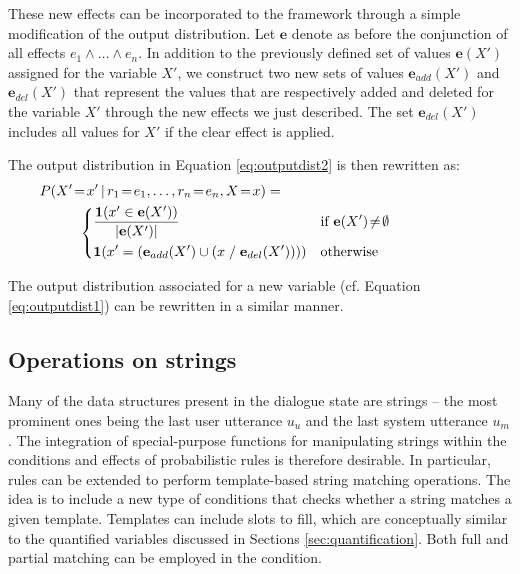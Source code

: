 These new effects can be incorporated to the framework through a simple modification of the output distribution. Let $\mathbf{e}$ denote as before the conjunction of all effects $e_1 \land \dots \land e_n$. In addition to the previously defined set of values $\mathbf{e}(X')$ assigned for the variable $X'$, we construct two new sets of values $\mathbf{e}_{add}(X')$ and $\mathbf{e}_{del}(X')$ that represent the values that are respectively added and deleted for the variable $X'$ through the new effects we just described. The set $\mathbf{e}_{del}(X')$ includes all values for $X'$ if the clear effect is applied. 

The output distribution in Equation \eqref{eq:outputdist2} is then rewritten as:
\begin{align}
&P(X'\!=\!x' \, | \, r_1\!=\!e_1, \dots, r_n\!=\!e_n, X\!=\!x) = \hspace{5cm} \nonumber \\ & \; \; \; \; \; \; \; \; \; \;  \begin{dcases} 
\frac{ \mathbf{1}(x' \in {\mathbf{e}(X')})} { |\mathbf{e}(X')| }  & \text{if } \mathbf{e}(X')\!\neq\!\emptyset \\
\mathbf{1}(x' = \left(\mathbf{e}_{add}(X') \cup \left(x \; / \; \mathbf{e}_{del}(X')\right)\right)) & \text{otherwise} \\
\end{dcases}\label{eq:outputdist4}
\end{align} 

The output distribution associated for a new variable (cf. Equation \eqref{eq:outputdist1}) can be rewritten in a similar manner.




\subsection{Operations on strings}

Many of the data structures present in the dialogue state are strings -- the most prominent ones being the last user utterance $u_u$ and the last system utterance $u_m$. The integration of special-purpose functions for manipulating strings within the conditions and effects of probabilistic rules is therefore desirable. In particular, rules can be extended to perform template-based string matching operations.  The idea is to include a new type of conditions that checks whether a string matches a given template. Templates can include slots to fill, which are conceptually similar to the quantified variables discussed in Sections \ref{sec:quantification}.   Both full and partial matching can be employed in the condition.

